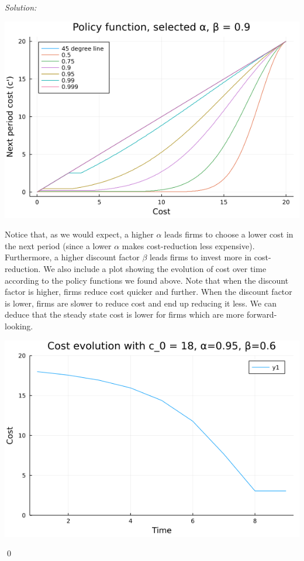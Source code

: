\documentclass[12pt]{article}
\newenvironment{sol}
           {\emph{Solution:}
           }
           {
           \qed
           }
\begin{document}
\begin{sol}
\begin{center}
            \includegraphics[scale=0.6]{pfplotbeta=9}
        \end{center}
        Notice that, as we would expect, a higher $\alpha$ leads firms to choose a lower cost in the next period (since a lower $\alpha$ makes cost-reduction less expensive). Furthermore, a higher discount factor $\beta$ leads firms to invest more in cost-reduction. We also include a plot showing the evolution of cost over time according to the policy functions we found above. Note that when the discount factor is higher, firms reduce cost quicker and further. When the discount factor is lower, firms are slower to reduce cost and end up reducing it less. We can deduce that the steady state cost is lower for firms which are more forward-looking.
        \begin{center}
            \includegraphics[scale=0.6]{costevol6}

\end{center}
\end{sol}
\end{document}
